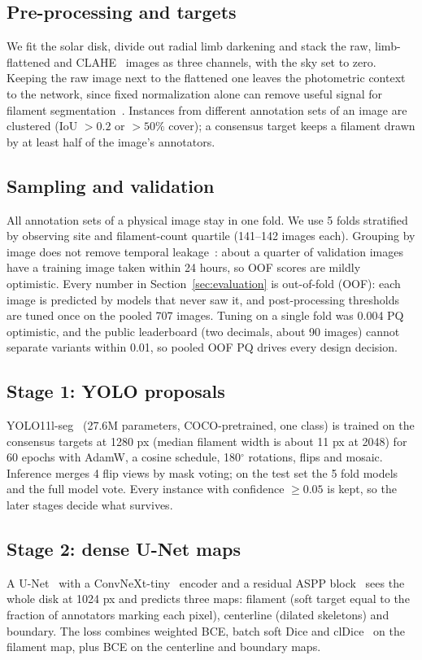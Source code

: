 \documentclass[sigconf]{acmart}
\begin{document}
\subsection{Pre-processing and targets}
    We fit the solar disk, divide out radial limb darkening and stack the raw, limb-flattened and
    CLAHE~\cite{zuiderveld1994clahe} images as three channels, with the sky set to zero.
    Keeping the raw image next to the flattened one leaves the photometric context to the network, since
    fixed normalization alone can remove useful signal for filament segmentation~\cite{stepanyuk2026datadriven}. Instances from
    different annotation sets of an image are clustered (IoU $>0.2$ or $>50\%$ cover); a consensus target
    keeps a filament drawn by at least half of the image's annotators.

\subsection{Sampling and validation}
    All annotation sets of a physical image stay in one fold. We use 5 folds stratified by observing site
    and filament-count quartile (141--142 images each). Grouping by image does not remove temporal
    leakage~\cite{stepanyuk2026datadriven}: about a quarter of validation images have a training image
    taken within 24 hours, so OOF scores are mildly optimistic. Every number in
    Section~\ref{sec:evaluation} is out-of-fold (OOF): each image is predicted by models that never saw it, and post-processing thresholds
    are tuned once on the pooled 707 images. Tuning on a single fold was 0.004 PQ optimistic, and the public
    leaderboard (two decimals, about 90 images) cannot separate variants within 0.01, so pooled OOF PQ drives
    every design decision.

\subsection{Stage 1: YOLO proposals}
    YOLO11l-seg~\cite{yolo11} (27.6M parameters, COCO-pretrained, one class) is trained on the consensus
    targets at 1280 px (median filament width is about 11 px at 2048) for 60 epochs with AdamW, a cosine
    schedule, 180$^\circ$ rotations, flips and mosaic. Inference merges 4 flip views by mask voting; on the
    test set the 5 fold models and the full model vote. Every instance with confidence $\ge 0.05$ is kept,
    so the later stages decide what survives.

\subsection{Stage 2: dense U-Net maps}
    A U-Net~\cite{ronneberger2015unet} with a ConvNeXt-tiny~\cite{liu2022convnext} encoder and a residual
    ASPP block~\cite{chen2017deeplab} sees the whole disk at 1024 px and predicts three maps: filament (soft
    target equal to the fraction of annotators marking each pixel), centerline (dilated skeletons) and
    boundary. The loss combines weighted BCE, batch soft Dice and clDice~\cite{shit2021cldice} on the
    filament map, plus BCE on the centerline and boundary maps.
\end{document}
